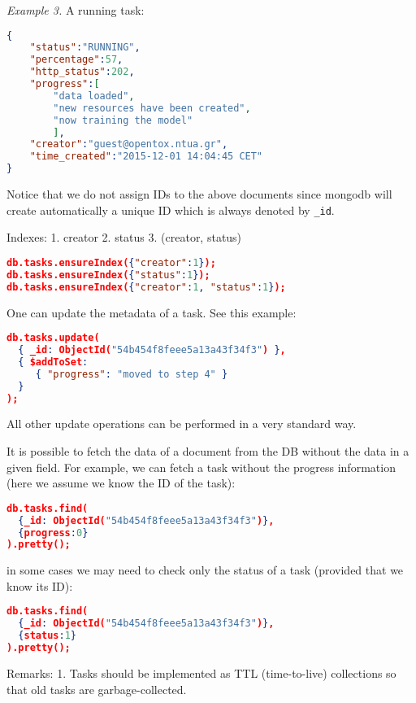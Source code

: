\noindent \textit{Example 3.} A running task:
\begin{lstlisting}[language=json]
{ 
    "status":"RUNNING", 
    "percentage":57, 
    "http_status":202, 
    "progress":[ 
        "data loaded", 
        "new resources have been created", 
        "now training the model" 
        ], 
    "creator":"guest@opentox.ntua.gr", 
    "time_created":"2015-12-01 14:04:45 CET" 
} 
\end{lstlisting}

Notice that we do not assign IDs to the above documents since 
mongodb will create automatically a unique ID which is always 
denoted by \texttt{\_id}.

Indexes:
1. creator
2. status
3. (creator, status)

\begin{lstlisting}[language=json]
db.tasks.ensureIndex({"creator":1});
db.tasks.ensureIndex({"status":1});
db.tasks.ensureIndex({"creator":1, "status":1});
\end{lstlisting}

One can update the metadata of a task. 
See this example:
\begin{lstlisting}[language=json]
db.tasks.update( 
  { _id: ObjectId("54b454f8feee5a13a43f34f3") },  
  { $addToSet:  
     { "progress": "moved to step 4" } 
  } 
); 
\end{lstlisting}

All other update operations can be performed in a very standard way.

It is possible to fetch the data of a document from the DB without the data in a given field. For example, we can fetch a task without the progress information (here we assume we know the ID of the task):

\begin{lstlisting}[language=json]
db.tasks.find(
  {_id: ObjectId("54b454f8feee5a13a43f34f3")}, 
  {progress:0}
).pretty();
\end{lstlisting}

in some cases we may need to check only the status of a task (provided that we know its ID):
\begin{lstlisting}[language=json]
db.tasks.find(
  {_id: ObjectId("54b454f8feee5a13a43f34f3")}, 
  {status:1}
).pretty();
\end{lstlisting}

Remarks:
1. Tasks should be implemented as TTL (time-to-live) collections so that old tasks are garbage-collected.